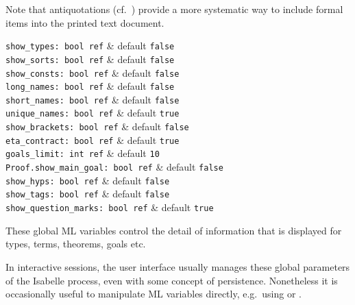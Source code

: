 \begin{isabellebody}
\begin{isamarkuptext}
  Note that antiquotations (cf.\ ) provide a more
  systematic way to include formal items into the printed text
  document.%
\end{isamarkuptext}%
\isamarkuptrue%
%
\isamarkuptrue%
%
\begin{isamarkuptext}%
\begin{mldecls} 
    \verb|show_types: bool ref| & default \verb|false| \\
    \verb|show_sorts: bool ref| & default \verb|false| \\
    \verb|show_consts: bool ref| & default \verb|false| \\
    \verb|long_names: bool ref| & default \verb|false| \\
    \verb|short_names: bool ref| & default \verb|false| \\
    \verb|unique_names: bool ref| & default \verb|true| \\
    \verb|show_brackets: bool ref| & default \verb|false| \\
    \verb|eta_contract: bool ref| & default \verb|true| \\
    \verb|goals_limit: int ref| & default \verb|10| \\
    \verb|Proof.show_main_goal: bool ref| & default \verb|false| \\
    \verb|show_hyps: bool ref| & default \verb|false| \\
    \verb|show_tags: bool ref| & default \verb|false| \\
    \verb|show_question_marks: bool ref| & default \verb|true| \\
  \end{mldecls}

  These global ML variables control the detail of information that is
  displayed for types, terms, theorems, goals etc.

  In interactive sessions, the user interface usually manages these
  global parameters of the Isabelle process, even with some concept of
  persistence.  Nonetheless it is occasionally useful to manipulate ML
  variables directly, e.g.\ using \hyperlink{command.ML-val}{\mbox{}} or \hyperlink{command.ML-command}{\mbox{}}.


\end{isamarkuptext}
\end{isabellebody}
